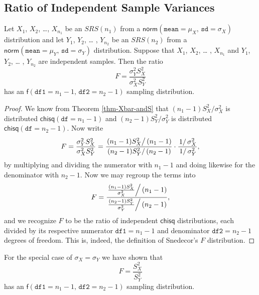 \subsection{Ratio of Independent Sample Variances}
\label{sec-8-4-3}

\begin{prop}
Let \(X_{1}\), \(X_{2}\), \ldots{}, \(X_{n_{1}}\) be an \(SRS(n_{1})\) from
a \(\mathsf{norm}(\mathtt{mean}=\mu_{X},\,\mathtt{sd}=\sigma_{X})\)
distribution and let \(Y_{1}\), \(Y_{2}\), \ldots{} , \(Y_{n_{2}}\) be an
\(SRS(n_{2})\) from a
\(\mathsf{norm}(\mathtt{mean}=\mu_{Y},\,\mathtt{sd}=\sigma_{Y})\)
distribution. Suppose that \(X_{1}\), \(X_{2}\), \ldots{} , \(X_{n_{1}}\)
and \(Y_{1}\), \(Y_{2}\), \ldots{} , \(Y_{n_{2}}\) are independent
samples. Then the ratio
\begin{equation}
F=\frac{\sigma_{Y}^{2}S_{X}^{2}}{\sigma_{X}^{2}S_{Y}^{2}}
\end{equation}
has an \(\mathsf{f}(\mathtt{df1}=n_{1}-1,\,\mathtt{df2}=n_{2}-1)\)
sampling distribution.
\end{prop}

\begin{proof}
We know from Theorem \ref{thm-Xbar-andS} that
\((n_{1}-1)S_{X}^{2}/\sigma_{X}^{2}\) is distributed
\(\mathsf{chisq}(\mathtt{df}=n_{1}-1)\) and
\((n_{2}-1)S_{Y}^{2}/\sigma_{Y}^{2}\) is distributed
\(\mathsf{chisq}(\mathtt{df}=n_{2}-1)\). Now write \[
F=\frac{\sigma_{Y}^{2}S_{X}^{2}}{\sigma_{X}^{2}S_{Y}^{2}}=\frac{\left.(n_{1}-1)S_{X}^{2}\right/
(n_{1}-1)}{\left.(n_{2}-1)S_{Y}^{2}\right/
(n_{2}-1)}\cdot\frac{\left.1\right/ \sigma_{X}^{2}}{\left.1\right/
\sigma_{Y}^{2}}, \] by multiplying and dividing the numerator with
\(n_{1}-1\) and doing likewise for the denominator with
\(n_{2}-1\). Now we may regroup the terms into \[
F=\frac{\left.\frac{(n_{1}-1)S_{X}^{2}}{\sigma_{X}^{2}}\right/
(n_{1}-1)}{\left.\frac{(n_{2}-1)S_{Y}^{2}}{\sigma_{Y}^{2}}\right/
(n_{2}-1)}, \] and we recognize \(F\) to be the ratio of independent
\(\mathsf{chisq}\) distributions, each divided by its respective
numerator \(\mathtt{df1}=n_{1}-1\) and denominator \(\mathtt{df2}=n_{2}-1\) degrees of freedom.
This is, indeed, the definition of Snedecor's \(F\) distribution.
\end{proof}

\begin{rem}
For the special case of \(\sigma_{X}=\sigma_{Y}\) we have shown that
\begin{equation}
F=\frac{S_{X}^{2}}{S_{Y}^{2}}
\end{equation}
has an \(\mathsf{f}(\mathtt{df1}=n_{1}-1,\,\mathtt{df2}=n_{2}-1)\)
sampling distribution.
\end{rem}

